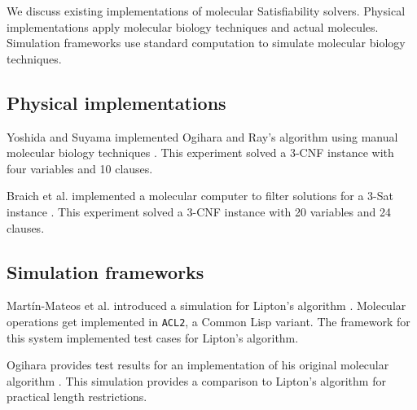 We discuss existing implementations of molecular {\sc Satisfiability} solvers.  Physical implementations apply molecular biology techniques and actual molecules.  Simulation frameworks use standard computation to simulate molecular biology techniques.

	\subsection{Physical implementations}
	

Yoshida and Suyama implemented Ogihara and Ray's algorithm using manual molecular biology techniques \cite{dnaBasedImplemetation_Yoshida2000}.  This experiment solved a 3-CNF instance with four variables and 10 clauses.

Braich et al. implemented a molecular computer to filter solutions for a 3-{\sc Sat} instance \cite{Braich02solutionof}.  This experiment solved a 3-CNF instance with 20 variables and 24 clauses.
	
	\subsection{Simulation frameworks}

Mart\'{i}n-Mateos et al. introduced a simulation for Lipton's algorithm \cite{MartinMateos02molecularcomputation}.   Molecular operations get implemented in \texttt{ACL2}, a Common Lisp variant.  The framework for this system implemented test cases for Lipton's algorithm.

Ogihara provides test results for an implementation of his original molecular algorithm \cite{Ogihara:1996:BFS:898228}.  This simulation provides a comparison to Lipton's algorithm for practical length restrictions.
